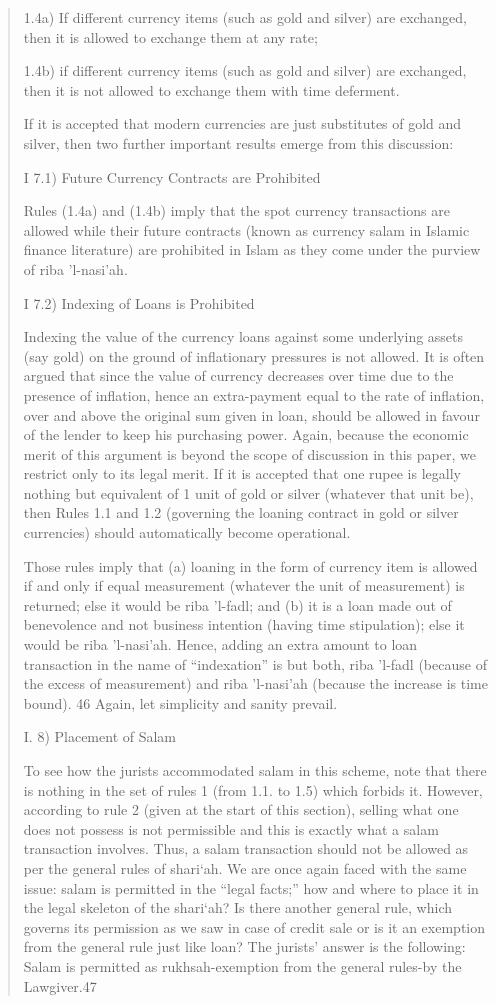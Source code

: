 \begin{quote}
1.4a) If different currency items (such as gold and silver) are exchanged, then it is allowed to exchange them at any rate;

1.4b) if different currency items (such as gold and silver) are exchanged, then it is not allowed to exchange them with time deferment.

If it is accepted that modern currencies are just substitutes of gold and silver, then two further important results emerge from this discussion:

I 7.1) Future Currency Contracts are Prohibited

Rules (1.4a) and (1.4b) imply that the spot currency transactions are allowed while their future contracts (known as currency salam in Islamic finance literature) are prohibited in Islam as they come under the purview of riba 'l-nasi'ah.

I 7.2) Indexing of Loans is Prohibited

Indexing the value of the currency loans against some underlying assets (say gold) on the ground of inflationary pressures is not allowed. It is often argued that since the value of currency decreases over time due to the presence of inflation, hence an extra-payment equal to the rate of inflation, over and above the original sum given in loan, should be allowed in favour of the lender to keep his purchasing power. Again, because the economic merit of this argument is beyond the scope of discussion in this paper, we restrict only to its legal merit. If it is accepted that one rupee is legally nothing but equivalent of 1 unit of gold or silver (whatever that unit be), then Rules 1.1 and 1.2 (governing the loaning contract in gold or silver currencies) should automatically become operational.

Those rules imply that (a) loaning in the form of currency item is allowed if and only if equal measurement (whatever the unit of measurement) is returned; else it would be riba 'l-fadl; and (b) it is a loan made out of benevolence and not business intention (having time stipulation); else it would be riba 'l-nasi'ah. Hence, adding an extra amount to loan transaction in the name of “indexation” is but both, riba 'l-fadl (because of the excess of measurement) and riba 'l-nasi'ah (because the increase is time bound). 46 Again, let simplicity and sanity prevail.

I. 8) Placement of Salam

To see how the jurists accommodated salam in this scheme, note that there is nothing in the set of rules 1 (from 1.1. to 1.5) which forbids it. However, according to rule 2 (given at the start of this section), selling what one does not possess is not permissible and this is exactly what a salam transaction involves. Thus, a salam transaction should not be allowed as per the general rules of shari‘ah. We are once again faced with the same issue: salam is permitted in the “legal facts;” how and where to place it in the legal skeleton of the shari‘ah? Is there another general rule, which governs its permission as we saw in case of credit sale or is it an exemption from the general rule just like loan? The jurists' answer is the following: Salam is permitted as rukhsah-exemption from the general rules-by the Lawgiver.47


\end{quote}
